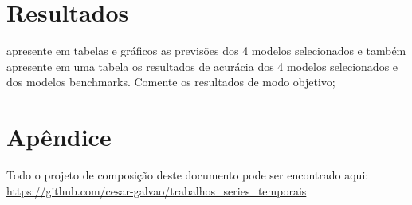 \documentclass[
  letterpaper,
  DIV=11,
  numbers=noendperiod]{scrartcl}
\begin{document}
\newpage{}

\hypertarget{resultados}{%
\section{Resultados}\label{resultados}}

apresente em tabelas e gráficos as previsões dos 4 modelos selecionados
e também apresente em uma tabela os resultados de acurácia dos 4 modelos
selecionados e dos modelos benchmarks. Comente os resultados de modo
objetivo;

\hypertarget{apuxeandice}{%
\section{Apêndice}\label{apuxeandice}}

Todo o projeto de composição deste documento pode ser encontrado aqui:
\url{https://github.com/cesar-galvao/trabalhos_series_temporais}
\end{document}
